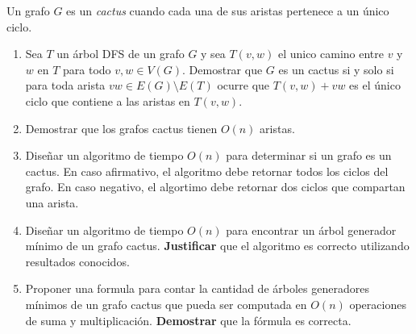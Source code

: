 
 \item Un grafo $G$ es un \emph{cactus} cuando cada una de sus aristas pertenece a un único ciclo.

 \begin{enumerate}
  \item Sea $T$ un árbol DFS de un grafo $G$ y sea $T(v,w)$ el unico camino entre $v$ y $w$ en $T$ para todo $v,w\in V(G)$.  Demostrar que $G$ es un cactus si y solo si para toda arista $vw \in E(G) \setminus E(T)$ ocurre que $T(v,w) + vw$ es el único ciclo que contiene a las aristas en $T(v,w)$.

  \item Demostrar que los grafos cactus tienen $O(n)$ aristas.

  \item Diseñar un algoritmo de tiempo $O(n)$ para determinar si un grafo es un cactus.  En caso afirmativo, el algoritmo debe retornar todos los ciclos del grafo.  En caso negativo, el algortimo debe retornar dos ciclos que compartan una arista.

  \item Diseñar un algoritmo de tiempo $O(n)$ para encontrar un árbol generador mínimo de un grafo cactus.  \textbf{Justificar} que el algoritmo es correcto utilizando resultados conocidos.

  \item Proponer una formula para contar la cantidad de árboles generadores mínimos de un grafo cactus que pueda ser computada en $O(n)$ operaciones de suma y multiplicación.  \textbf{Demostrar} que la fórmula es correcta.
 \end{enumerate}



